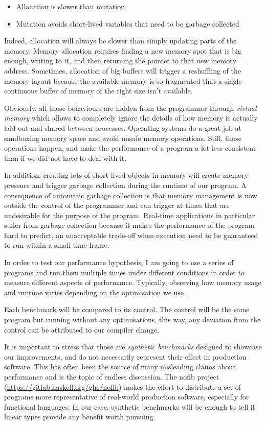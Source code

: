 \documentclass[
]{article}
\providecommand{\tightlist}{%
  \setlength{\itemsep}{0pt}\setlength{\parskip}{0pt}}
\begin{document}
\begin{itemize}
\tightlist
\item
  Allocation is slower than mutation
\item
  Mutation avoids short-lived variables that need to be garbage
  collected
\end{itemize}

Indeed, allocation will always be slower than simply updating parts of
the memory. Memory allocation requires finding a new memory spot that is
big enough, writing to it, and then returning the pointer to that new
memory address. Sometimes, allocation of big buffers will trigger a
reshuffling of the memory layout because the available memory is so
fragmented that a single continuous buffer of memory of the right size
isn't available.

Obviously, all those behaviours are hidden from the programmer through
\emph{virtual memory} which allows to completely ignore the details of
how memory is actually laid out and shared between processes. Operating
systems do a great job at sandboxing memory space and avoid unsafe
memory operations. Still, those operations happen, and make the
performance of a program a lot less consistent than if we did not have
to deal with it.

In addition, creating lots of short-lived objects in memory will create
memory pressure and trigger garbage collection during the runtime of our
program. A consequence of automatic garbage collection is that memory
management is now outside the control of the programmer and can trigger
at times that are undesirable for the purpose of the program. Real-time
applications in particular suffer from garbage collection because it
makes the performance of the program hard to predict, an unacceptable
trade-off when execution need to be guaranteed to run within a small
time-frame.

In order to test our performance hypothesis, I am going to use a series
of programs and run them multiple times under different conditions in
order to measure different aspects of performance. Typically, observing
how memory usage and runtime varies depending on the optimisation we
use.

Each benchmark will be compared to its control. The control will be the
same program but running without any optimisations, this way, any
deviation from the control can be attributed to our compiler change.

It is important to stress that those are \emph{synthetic benchmarks}
designed to showcase our improvements, and do not necessarily represent
their effect in production software. This has often been the source of
many misleading claims about performance and is the topic of endless
discussion. The nofib\cite{nofib} project
(\url{https://gitlab.haskell.org/ghc/nofib}) makes the effort to
distribute a set of programs more representative of real-world
production software, especially for functional languages. In our case,
synthetic benchmarks will be enough to tell if linear types provide any
benefit worth pursuing.
\end{document}

